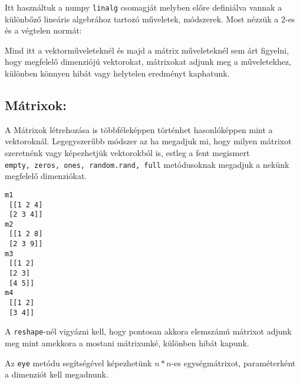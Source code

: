     Itt használtuk a numpy \texttt{linalg} csomagját melyben előre
definiálva vannak a különbőző lineáris algebrához tartozó műveletek,
módszerek. Most nézzük a 2-es és a végtelen normát:

\begin{python}

\end{python}

    Mind itt a vektorműveleteknél és majd a mátrix műveleteknél sem árt
figyelni, hogy megfelelő dimenziójú vektorokat, mátrixokat adjunk meg a
műveletekhez, különben könnyen hibát vagy helytelen eredményt kaphatunk.

    \subsection{Mátrixok:}\label{muxe1trixok}

    A Mátrixok létrehozása is többféleképpen történhet hasonlóképpen mint a
vektoroknál. Legegyszerűbb módszer az ha megadjuk mi, hogy milyen
mátrixot szeretnénk vagy képezhetjük vektorokból is, estleg a fent
megismert \texttt{empty,\ zeros,\ ones,\ random.rand,\ full}
metódusoknak megadjuk a nekünk megfelelő dimenziókat.

   \begin{python}

\end{python}

\begin{verbatim}
m1
 [[1 2 4]
 [2 3 4]]
m2
 [[1 2 8]
 [2 3 9]]
m3
 [[1 2]
 [2 3]
 [4 5]]
m4
 [[1 2]
 [3 4]]
\end{verbatim}

\begin{python}

\end{python}

\begin{python}

\end{python}

    A \texttt{reshape}-nél vigyázni kell, hogy pontosan akkora elemszámú
mátrixot adjunk meg mint amekkora a mostani mátrixunké, különben hibát
kapunk.

\begin{python}

\end{python}

    Az \texttt{eye} metódu segítségével képezhetünk \(n*n\)-es
egységmátrixot, paraméterként a dimenziót kell megadnunk.

